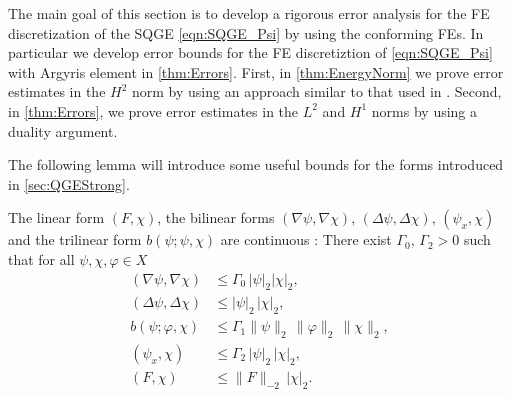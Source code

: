 The main goal of this section is to develop a rigorous error analysis for the FE
discretization of the SQGE \eqref{eqn:SQGE_Psi} by using the conforming FEs. In
particular we develop error bounds for the FE discretiztion of
\eqref{eqn:SQGE_Psi} with Argyris element in \autoref{thm:Errors}. First, in
\autoref{thm:EnergyNorm} we prove error estimates in the $H^2$ norm by using an
approach similar to that used in \cite{Cayco86}.  Second, in
\autoref{thm:Errors}, we prove error estimates in the $L^2$ and $H^1$ norms by
using a duality argument.

The following lemma will introduce some useful bounds for the forms introduced
in \autoref{sec:QGEStrong}.
\begin{lemma} \label{lma:ContinuousForms}
  The linear form $(F,\chi)$, the bilinear forms $(\nabla \psi, \nabla \chi)$,
  $(\Delta \psi, \Delta \chi)$, $(\psi_x, \chi)$ and the trilinear form $b(\psi;
  \psi, \chi)$ are continuous \cite{Cayco86}: There exist $\Gamma_0,\,
   \Gamma_2 > 0$ such that for all $\psi, \chi, \varphi\in X$
  \begin{align}
    (\nabla \psi, \nabla \chi) &\le \Gamma_0\, |\psi|_2 |\chi|_2,
      \label{eqn:a0cont} \\
    (\Delta \psi, \Delta \chi) &\le |\psi|_2\, |\chi|_2, \label{eqn:a1Cont} \\
    b(\psi;\varphi,\chi) &\le \Gamma_1 \|\psi\|_2\, \|\varphi\|_2\, \|\chi\|_2,
      \label{eqn:BH2Bounds} \\
    (\psi_x,\chi) &\le \Gamma_2 \, |\psi|_2 \, |\chi|_2, \label{eqn:a3Cont} \\
    (F,\chi) &\le \|F\|_{-2} \, |\chi|_2.
      \label{eqn:lCont}
  \end{align}
\end{lemma}
